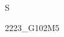 S\documentclass[
	10pt,
	paper=A4,
	landscape,
	DIV=calc,
	twocolumn
]{article}
\begin{document}
	{2223_G102M5}
\end{document}
